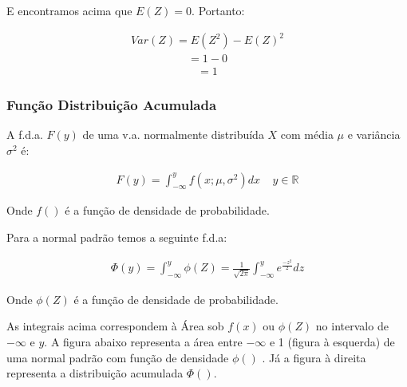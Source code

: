 \documentclass[
  letterpaper,
  DIV=11,
  numbers=noendperiod]{scrartcl}
\begin{document}
\begin{teorema}
E encontramos acima que \(E(Z)=0\). Portanto:

\[\begin{array}{ccc}
Var(Z)=E(Z ^{2})-E(Z) ^{2}
\end{array}\] \[\begin{array}{ccc}
= 1 -0
\end{array}\] \[\begin{array}{ccc}
= 1
\end{array}\]

\end{teorema}

\subsubsection{Função Distribuição
Acumulada}\label{funuxe7uxe3o-distribuiuxe7uxe3o-acumulada-1}

\begin{definicao}

A f.d.a. \(F(y)\) de uma v.a. normalmente distribuída \(X\) com média
\(\mu\) e variância \(\sigma^{2}\) é:

\[\begin{array}{ccc}
F(y)=\int_{-\infty}^{y} f(x;\mu,\sigma^{2})dx\ \ \ \ \ y \in \mathbb{R}
\end{array}\]

Onde \(f()\) é a função de densidade de probabilidade.

Para a normal padrão temos a seguinte f.d.a:

\[\begin{array}{ccc}
\Phi(y)=\int_{-\infty}^{y} \phi(Z)= \frac{1}{\sqrt{2\pi}}\int_{-\infty}^{y} e^{\frac{-z^{2} }{2}}dz 
\end{array}\]

Onde \(\phi(Z)\) é a função de densidade de probabilidade.

\end{definicao}

As integrais acima correspondem à Área sob \(f(x)\) ou \(\phi(Z)\) no
intervalo de \(-\infty\) e \(y\). A figura abaixo representa a área
entre \(-\infty\) e 1 (figura à esquerda) de uma normal padrão com
função de densidade \(\phi()\) . Já a figura à direita representa a
distribuição acumulada \(\Phi()\).\\
\end{document}
